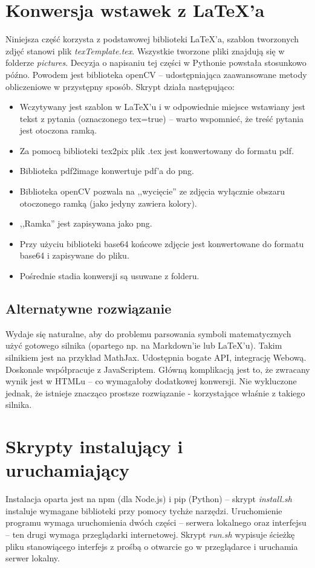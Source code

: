 \section{Konwersja wstawek z \LaTeX{}'a}
Niniejsza część korzysta z podstawowej biblioteki \LaTeX{}'a, szablon tworzonych zdjęć stanowi plik \textit{texTemplate.tex}. Wszystkie tworzone pliki znajdują się w folderze \textit{pictures}.
\ind Decyzja o napisaniu tej części w Pythonie powstała stosunkowo późno. Powodem jest biblioteka openCV -- udostępniająca zaawansowane metody obliczeniowe w przystępny sposób. Skrypt działa następująco:
\begin{itemize}
\item Wczytywany jest szablon w \LaTeX{}'u i w odpowiednie miejsce wstawiany jest tekst z pytania (oznaczonego tex=true) -- warto wspomnieć, że treść pytania jest otoczona ramką.
\item Za pomocą biblioteki tex2pix plik .tex jest konwertowany do formatu pdf.
\item Biblioteka pdf2image konwertuje pdf'a do png.
\item Biblioteka openCV pozwala na ,,wycięcie'' ze zdjęcia wyłącznie obszaru otoczonego ramką (jako jedyny zawiera kolory).
\item ,,Ramka'' jest zapisywana jako png.
\item Przy użyciu biblioteki base64 końcowe zdjęcie jest konwertowane do formatu base64 i zapisywane do pliku.
\item Pośrednie stadia konwersji są usuwane z folderu.
\end{itemize}
\subsection{Alternatywne rozwiązanie}%
Wydaje się naturalne, aby do problemu parsowania symboli matematycznych użyć gotowego silnika (opartego np. na Markdown'ie lub \LaTeX{}'u). Takim silnikiem jest na przykład MathJax. Udostępnia bogate API, integrację Webową. Doskonale współpracuje z JavaScriptem. Główną komplikacją jest to, że zwracany wynik jest w HTMLu -- co wymagałoby dodatkowej konwersji. Nie wykluczone jednak, że istnieje znacząco prostsze rozwiązanie - korzystające właśnie z takiego silnika.
\section{Skrypty instalujący i uruchamiający}
Instalacja oparta jest na npm (dla Node.js) i pip (Python) -- skrypt \textit{install.sh} instaluje wymagane biblioteki przy pomocy tychże narzędzi.
\ind  Uruchomienie programu wymaga uruchomienia dwóch części -- serwera lokalnego oraz interfejsu -- ten drugi wymaga przeglądarki internetowej. Skrypt \textit{run.sh} wypisuje ścieżkę pliku stanowiącego interfejs z prośbą o otwarcie go w przeglądarce i uruchamia serwer lokalny.










